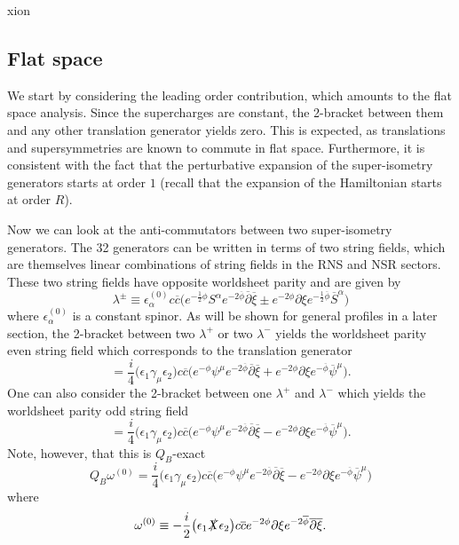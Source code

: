 xion\documentclass[12pt]{article}
\def\be{\begin{equation}}
\def\ee{\end{equation}}
\def\ie{\begin{equation}\begin{aligned}}
\def\fe{\end{aligned}\end{equation}}
\numberwithin{equation}{section}
\newcommand{\B}[1]{\overline{#1}}
\begin{document}
\subsection{Flat space}
We start by considering the leading order contribution, which amounts to the flat space analysis. Since the supercharges are constant, the 2-bracket between them and any other translation generator yields zero. This is expected, as translations and supersymmetries are known to commute in flat space. Furthermore, it is consistent with the fact that the perturbative expansion of the super-isometry generators starts at order $1$ (recall that the expansion of the Hamiltonian starts at order $R$).

Now we can look at the anti-commutators between two super-isometry generators. The 32 generators can be written in terms of two string fields, which are themselves linear combinations of string fields in the RNS and NSR sectors. These two string fields have opposite worldsheet parity and are given by
\be \label{FlatSusy}
    \lambda^{\pm}\equiv\epsilon^{(0)}_{\alpha}c\B{c}\big(e^{-\frac{1}{2}\phi}S^{\alpha}e^{-2\B{\phi}}\B{\partial}\B{\xi}\pm e^{-2\phi}\partial\xi e^{-\frac{1}{2}\B{\phi}}\B{S}^{\alpha}\big)
\ee
where $\epsilon^{(0)}_{\alpha}$ is a constant spinor. As will be shown for general profiles in a later section, the 2-bracket between two $\lambda^+$ or two $\lambda^-$ yields the worldsheet parity even string field which corresponds to the translation generator
\be
    [\lambda_1^{\pm}\otimes\lambda_2^{\pm}]=\frac{i}{4}\big(\epsilon_1\gamma_{\mu}\epsilon_2\big)c\B{c}\big(e^{-\phi}\psi^{\mu}e^{-2\B{\phi}}\B{\partial}\B{\xi}+e^{-2\phi}\partial\xi e^{-\B{\phi}}\B{\psi}^{\mu}\big).
\ee
One can also consider the 2-bracket between one $\lambda^+$ and $\lambda^-$ which yields the worldsheet parity odd string field
\be
    [\lambda_1^{+}\otimes\lambda_2^{-}]=\frac{i}{4}\big(\epsilon_1\gamma_{\mu}\epsilon_2\big)c\B{c}\big(e^{-\phi}\psi^{\mu}e^{-2\B{\phi}}\B{\partial}\B{\xi}-e^{-2\phi}\partial\xi e^{-\B{\phi}}\B{\psi}^{\mu}\big).
\ee
Note, however, that this is $Q_{B}$-exact
\be
    Q_{B}\omega^{(0)}=\frac{i}{4}\big(\epsilon_1\gamma_{\mu}\epsilon_2\big)c\B{c}\big(e^{-\phi}\psi^{\mu}e^{-2\B{\phi}}\B{\partial}\B{\xi}-e^{-2\phi}\partial\xi e^{-\B{\phi}}\B{\psi}^{\mu}\big)
\ee
where
\ie
    \omega^{(0)}\equiv-\frac{i}{2}\big(\epsilon_1\slashed{X}\epsilon_2\big)c\B{c}e^{-2\phi}\partial\xi e^{-2\B{\phi}}\B{\partial}\B{\xi}.
\fe
\end{document}
